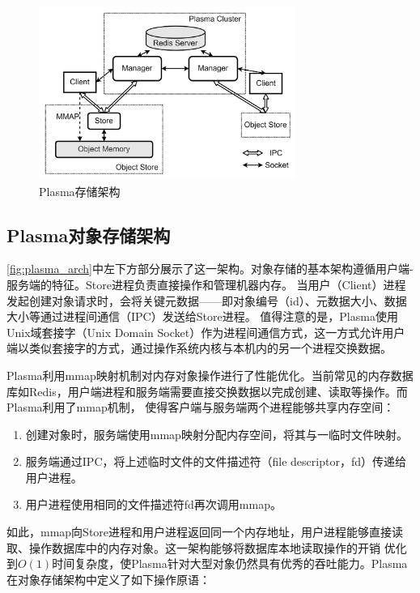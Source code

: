 \begin{figure}[h] 
    \centering
    \includegraphics[width=0.75\textwidth]{image/chap02/plasma_arch.png}
    \caption{Plasma存储架构}
    \label{fig:plasma_arch}
\end{figure}

\subsection{Plasma对象存储架构}

\autoref{fig:plasma_arch}中左下方部分展示了这一架构。对象存储的基本架构遵循用户端-服务端的特征。Store进程负责直接操作和管理机器内存。
当用户（Client）进程发起创建对象请求时，会将关键元数据——即对象编号（id）、元数据大小、数据大小等通过进程间通信（IPC）发送给Store进程。
值得注意的是，Plasma使用Unix域套接字（Unix Domain Socket）作为进程间通信方式，这一方式允许用户端以类似套接字的方式，通过操作系统内核与本机内的另一个进程交换数据。

Plasma利用mmap映射机制对内存对象操作进行了性能优化。当前常见的内存数据库如Redis，用户端进程和服务端需要直接交换数据以完成创建、读取等操作。而Plasma利用了mmap机制，
使得客户端与服务端两个进程能够共享内存空间：

\begin{enumerate}
    \item 创建对象时，服务端使用mmap映射分配内存空间，将其与一临时文件映射。
    \item 服务端通过IPC，将上述临时文件的文件描述符（file descriptor，fd）传递给用户进程。
    \item 用户进程使用相同的文件描述符fd再次调用mmap。
\end{enumerate}

如此，mmap向Store进程和用户进程返回同一个内存地址，用户进程能够直接读取、操作数据库中的内存对象。这一架构能够将数据库本地读取操作的开销
优化到$O(1)$时间复杂度，使Plasma针对大型对象仍然具有优秀的吞吐能力。Plasma在对象存储架构中定义了如下操作原语：

